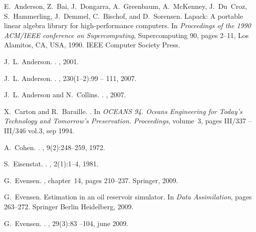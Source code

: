 \documentclass[12pt]{article}
\begin{document}

\begin{thebibliography}{10}

E.~Anderson, Z.~Bai, J.~Dongarra, A.~Greenbaum, A.~McKenney, J.~Du~Croz,
  S.~Hammerling, J.~Demmel, C.~Bischof, and D.~Sorensen.
\newblock Lapack: A portable linear algebra library for high-performance
  computers.
\newblock In {\em Proceedings of the 1990 ACM/IEEE conference on
  Supercomputing}, Supercomputing 90, pages 2--11, Los Alamitos, CA, USA, 1990.
  IEEE Computer Society Press.

J.~L. Anderson.
.
, 2001.

J.~L. Anderson.
.
, 230(1--2):99 -- 111, 2007.

J.~L. Anderson and N.~Collins.
.
, 2007.

X.~Carton and R.~Baraille.
.
\newblock In {\em OCEANS 94. Oceans Engineering for Today's Technology and
  Tomorrow's Preservation. Proceedings}, volume~3, pages III/337 --III/346
  vol.3, sep 1994.

A.~Cohen.
.
, 9(2):248--259, 1972.

S.~Eisenstat.
.
,
  2(1):1--4, 1981.

G.~Evensen.
, chapter~14,
  pages 210--237.
\newblock Springer, 2009.

G.~Evensen.
\newblock Estimation in an oil reservoir simulator.
\newblock In {\em Data Assimilation}, pages 263--272. Springer Berlin
  Heidelberg, 2009.

G.~Evensen.
.
, 29(3):83 --104, june 2009.


\end{thebibliography}
\end{document}
